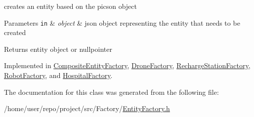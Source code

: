 creates an entity based on the picson object 


\begin{DoxyParams}[1]{Parameters}
\mbox{\tt in}  & {\em object} & json object representing the entity that needs to be created\\
\hline
\end{DoxyParams}
\begin{DoxyReturn}{Returns}
entity object or nullpointer 
\end{DoxyReturn}


Implemented in \hyperlink{classCompositeEntityFactory_a97b2f95333369f946d0f3ab2116b5f19}{Composite\+Entity\+Factory}, \hyperlink{classDroneFactory_a058b7be67ed594854ab9605236fa5c7e}{Drone\+Factory}, \hyperlink{classRechargeStationFactory_a5a870c5d317e1ec6932dc2a03d571474}{Recharge\+Station\+Factory}, \hyperlink{classRobotFactory_abcf3e19faf1d87fe2393b275b07c3549}{Robot\+Factory}, and \hyperlink{classHospitalFactory_a03bde29949e311469a3153da4e833622}{Hospital\+Factory}.



The documentation for this class was generated from the following file\+:\begin{DoxyCompactItemize}
\item 
/home/user/repo/project/src/\+Factory/\hyperlink{EntityFactory_8h}{Entity\+Factory.\+h}\end{DoxyCompactItemize}
